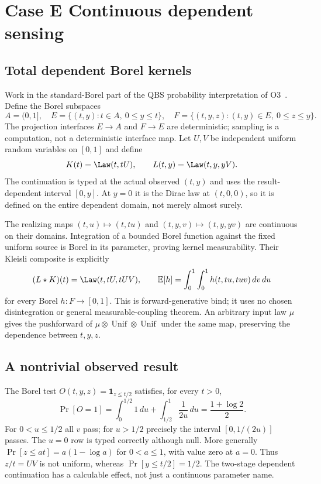 \section{Case E Continuous dependent sensing}\label{sec:caseE}

\subsection{Total dependent Borel kernels}
Work in the standard-Borel part of the QBS probability interpretation
of O3~\cite{O3}. Define the Borel subspaces
\[
A=(0,1],\quad E=\{(t,y):t\in A,\ 0\leq y\leq t\},\quad
F=\{(t,y,z):(t,y)\in E,\ 0\leq z\leq y\}.
\]
The projection interfaces $E\to A$ and $F\to E$ are deterministic;
sampling is a computation, not a deterministic interface map. Let
$U,V$ be independent uniform random variables on $[0,1]$ and define
\[
K(t)=\Law(t,tU),\qquad L(t,y)=\Law(t,y,yV).
\]
The continuation is typed at the actual observed $(t,y)$ and uses the
result-dependent interval $[0,y]$. At $y=0$ it is the Dirac law at
$(t,0,0)$, so it is defined on the entire dependent domain, not merely
almost surely.

The realizing maps $(t,u)\mapsto(t,tu)$ and
$(t,y,v)\mapsto(t,y,yv)$ are continuous on their domains. Integration
of a bounded Borel function against the fixed uniform source is Borel
in its parameter, proving kernel measurability. Their Kleisli composite
is explicitly
\begin{equation}\label{eq:E-bind}
(L\star K)(t)=\Law(t,tU,tUV),\qquad
\mathbb E[h]=\int_0^1\int_0^1 h(t,tu,tuv)\,dv\,du
\end{equation}
for every Borel $h:F\to[0,1]$. This is forward-generative bind; it uses
no chosen disintegration or general measurable-coupling theorem. An
arbitrary input law $\mu$ gives the pushforward of
$\mu\otimes\operatorname{Unif}\otimes\operatorname{Unif}$ under the
same map, preserving the dependence between $t,y,z$.

\subsection{A nontrivial observed result}
The Borel test $O(t,y,z)=\mathbf1_{z\leq t/2}$ satisfies, for every
$t>0$,
\begin{equation}\label{eq:E-observation}
\Pr[O=1]=\int_0^{1/2}1\,du+
\int_{1/2}^1\frac{1}{2u}\,du=\frac{1+\log2}{2}.
\end{equation}
For $0<u\leq1/2$ all $v$ pass; for $u>1/2$ precisely the interval
$[0,1/(2u)]$ passes. The $u=0$ row is typed correctly although null.
More generally $\Pr[z\leq at]=a(1-\log a)$ for $0<a\leq1$, with
value zero at $a=0$. Thus $z/t=UV$ is not uniform, whereas
$\Pr[y\leq t/2]=1/2$. The two-stage dependent continuation has a
calculable effect, not just a continuous parameter name.

